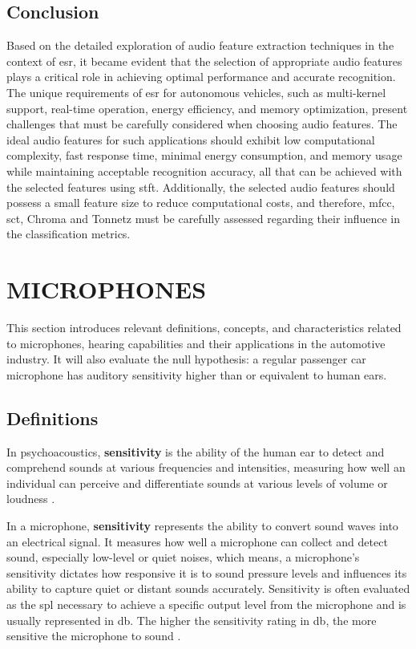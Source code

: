 \subsection{Conclusion}
\label{subsec:audio_fundamentals_conclusion}

Based on the detailed exploration of audio feature extraction techniques in the context of \gls{esr}, it became evident that the selection of appropriate audio features plays a critical role in achieving optimal performance and accurate recognition. The unique requirements of \gls{esr} for autonomous vehicles, such as multi-kernel support, real-time operation, energy efficiency, and memory optimization, present challenges that must be carefully considered when choosing audio features. The ideal audio features for such applications should exhibit low computational complexity, fast response time, minimal energy consumption, and memory usage while maintaining acceptable recognition accuracy, all that can be achieved with the selected features using \gls{stft}. Additionally, the selected audio features should possess a small feature size to reduce computational costs, and therefore, \gls{mfcc}, \gls{sct}, Chroma and Tonnetz must be carefully assessed regarding their influence in the classification metrics.


\section{MICROPHONES}
\label{sec:frmwk_microphones}

This section introduces relevant definitions, concepts, and characteristics related to microphones, hearing capabilities and their applications in the automotive industry. It will also evaluate the null hypothesis: a regular passenger car microphone has auditory sensitivity higher than or equivalent to human ears.


\subsection{Definitions}
\label{subsec:microphones_definitions}

In psychoacoustics, \textbf{sensitivity} is the ability of the human ear to detect and comprehend sounds at various frequencies and intensities, measuring how well an individual can perceive and differentiate sounds at various levels of volume or loudness \cite{Moore2013}.

In a microphone, \textbf{sensitivity} represents the ability to convert sound waves into an electrical signal. It measures how well a microphone can collect and detect sound, especially low-level or quiet noises, which means, a microphone's sensitivity dictates how responsive it is to sound pressure levels and influences its ability to capture quiet or distant sounds accurately. Sensitivity is often evaluated as the \gls{spl} necessary to achieve a specific output level from the microphone and is usually represented in \gls{db}. The higher the sensitivity rating in \gls{db}, the more sensitive the microphone to sound \cite{Rayburn2004}.

